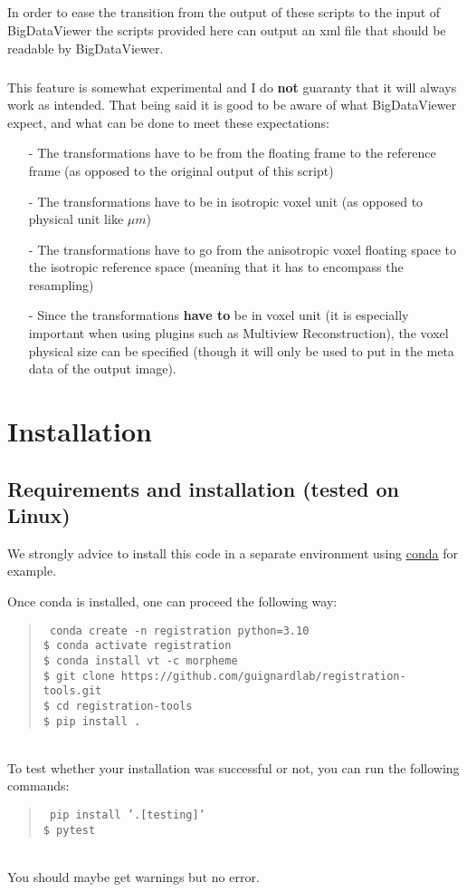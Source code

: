 \documentclass[10pt,a4paper]{book}
\newenvironment{code}[1]{\mbox{}\\[1ex]\hspace*{-#1cm}\begin{minipage}{150mm}\begin{quote}\tt}{\end{quote}\end{minipage}\mbox{}\\[1ex]}
\begin{document}
\paragraph{}In order to ease the transition from the output of these scripts to the input of BigDataViewer the scripts provided here can output an xml file that should be readable by BigDataViewer.
\paragraph{}This feature is somewhat experimental and I do \textbf{not} guaranty that it will always work as intended. That being said it is good to be aware of what BigDataViewer expect, and what can be done to meet these expectations:
\begin{itemize}
\item[-] The transformations have to be from the floating frame to the reference frame (as opposed to the original output of this script)
\item[-] The transformations have to be in isotropic voxel unit (as opposed to physical unit like $\mu m$)
\item[-] The transformations have to go from the anisotropic voxel floating space to the isotropic reference space (meaning that it has to encompass the resampling)
\item[-] Since the transformations \textbf{have to} be in voxel unit (it is especially important when using plugins such as Multiview Reconstruction), the voxel physical size can be specified (though it will only be used to put in the meta data of the output image).
\end{itemize}
\chapter{Installation}
\section{Requirements and installation (tested on Linux)}
We strongly advice to install this code in a separate environment using \underline{\href{https://conda.io/projects/conda/en/latest/user-guide/install/index.html}{conda}} for example.

Once conda is installed, one can proceed the following way:
\begin{code}{0.8}
\$ conda create -n registration python=3.10\\
\$ conda activate registration\\
\$ conda install vt -c morpheme\\
\$ git clone https://github.com/guignardlab/registration-tools.git\\
\$ cd registration-tools\\
\$ pip install .
\end{code}
To test whether your installation was successful or not, you can run the following commands:
\begin{code}{0.8}
\$ pip install '.[testing]'\\
\$ pytest
\end{code}
You should maybe get warnings but no error.
\end{document}
